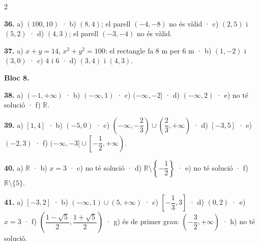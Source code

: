 \documentclass[13pt,a4paper]{extarticle}
\begin{document}
\begin{multicols}{2}
\par\noindent\begin{minipage}{\linewidth}
\textbf{36.} a) $(100,10)$ · b) $(8,4)$; el parell $(-4,-8)$ no és vàlid · c) $(2,5)$ i $(5,2)$ · d) $(4,3)$; el parell $(-3,-4)$ no és vàlid.\par
\end{minipage}\par\vspace{1.6mm}
\par\noindent\begin{minipage}{\linewidth}
\textbf{37.} a) $x+y=14$, $x^2+y^2=100$: el rectangle fa $8$ m per $6$ m · b) $(1,-2)$ i $(3,0)$ · c) $4$ i $6$ · d) $(3,4)$ i $(4,3)$.\par
\end{minipage}\par\vspace{1.6mm}
\textbf{Bloc 8.}\par
\par\noindent\begin{minipage}{\linewidth}
\textbf{38.} a) $(-1,+\infty)$ · b) $(-\infty,1)$ · c) $(-\infty,-2]$ · d) $(-\infty,2)$ · e) no té solució · f) $\mathbb{R}$.\par
\end{minipage}\par\vspace{1.6mm}
\par\noindent\begin{minipage}{\linewidth}
\textbf{39.} a) $[1,4]$ · b) $(-5,0)$ · c) $\left(-\infty,-\dfrac23\right)\cup\left(\dfrac23,+\infty\right)$ · d) $[-3,5]$ · e) $(-2,3)$ · f) $(-\infty,-3]\cup\left[-\dfrac12,+\infty\right)$.\par
\end{minipage}\par\vspace{1.6mm}
\par\noindent\begin{minipage}{\linewidth}
\textbf{40.} a) $\mathbb{R}$ · b) $x=3$ · c) no té solució · d) $\mathbb{R}\setminus\left\{-\dfrac12\right\}$ · e) no té solució · f) $\mathbb{R}\setminus\{5\}$.\par
\end{minipage}\par\vspace{1.6mm}
\par\noindent\begin{minipage}{\linewidth}
\textbf{41.} a) $[-3,2]$ · b) $(-\infty,1)\cup(5,+\infty)$ · c) $\left[-\dfrac13,3\right]$ · d) $(0,2)$ · e) $x=3$ · f) $\left(\dfrac{1-\sqrt5}{2},\dfrac{1+\sqrt5}{2}\right)$ · g) és de primer grau: $\left(-\dfrac32,+\infty\right)$ · h) no té solució.\par

\end{minipage}
\end{multicols}
\end{document}
